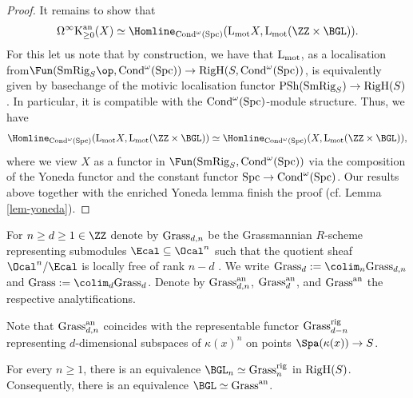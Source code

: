 \documentclass[colorinlistoftodos,article,11pt,reqno]{article}
\newcommand{\RigH}{\textup{RigH}}
\newcommand{\rig}{\textup{rig}}
\newcommand{\SmRig}{\textup{SmRig}}
\newcommand{\Cond}{\textup{Cond}}
\newcommand{\Spc}{\textup{Spc}}
\newcommand{\PSh}{\textup{PSh}}
\newcommand{\an}{\textup{an}}
\newcommand{\K}{\textup{K}}
\newcommand{\Kan}{\K^\textup{an}}
\renewcommand{\to}[1][]{\overset{#1}{\rightarrow}}
\renewcommand{\L}{\textup{L}}
\newcommand{\Lmot}{\L_{\textup{mot}}}
\begin{document}
\begin{proof}
It remains to show that
$$ 
\Omega^\infty\Kan_{\geq 0}(X) \simeq \Homline_{\Cond^\omega(\Spc)}(\Lmot X,\Lmot(\ZZ\times\BGL)).
$$
For this let us note that by construction, we have that $\Lmot$, as a localisation from\linebreak $\Fun(\SmRig_{S}\op,\Cond^{\omega}(\Spc))\to \RigH(S,\Cond^{\omega}(\Spc))$, is equivalently given by base\linebreak change of the motivic localisation functor $\PSh(\SmRig_S)\to \RigH(S)$. In particular, it is compatible with the $\Cond^{\omega}(\Spc
)$-module structure. Thus, we have 
$$
\Homline_{\Cond^\omega(\Spc)}(\Lmot X,\Lmot(\ZZ\times\BGL))\simeq \Homline_{\Cond^\omega(\Spc)}(X,\Lmot(\ZZ\times\BGL)),
$$
where we view $X$ as a functor in $\Fun(\SmRig_S,\Cond^\omega(\Spc))$ via the composition of the Yoneda functor and the constant functor $\Spc\to \Cond^\omega(\Spc)$.
Our results above together with the enriched Yoneda lemma finish the proof  (cf. Lemma \ref{lem-yoneda}).
\end{proof}

\begin{defi}
For $n\geq d\geq 1\in\ZZ$ denote by $\textup{Grass}_{d,n}$ be the Grassmannian $R$-scheme representing submodules $\Ecal\subseteq\Ocal^n$ such that the quotient sheaf $\Ocal^n/\Ecal$ is locally free of rank $n-d$ \cite[(8.4)]{GW1}. We write $\textup{Grass}_d := \colim_n\textup{Grass}_{d,n}$ and $\textup{Grass} := \colim_d\textup{Grass}_d$. Denote by $\textup{Grass}_{d,n}^\an$, $\textup{Grass}_d^\an$, and $\textup{Grass}^\an$ the respective analytifications.

Note that $\textup{Grass}_{d,n}^\an$ coincides with the representable functor $\textup{Grass}_{d-n}^\rig$ representing $d$-dimensional subspaces of $\kappa(x)^n$ on points $\Spa(\kappa(x))\to S$.
\end{defi}


\begin{prop} \label{Prop:BGL=Grass}
For every $n\geq 1$, there is an equivalence $\BGL_n\simeq\textup{Grass}_n^\rig$ in $\RigH(S)$. Consequently, there is an equivalence $\BGL\simeq\textup{Grass}^\an$.
\end{prop}
\end{document}

